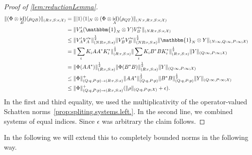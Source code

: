 \documentclass[11pt]{article}
\DeclareMathOperator{\id}{id}
\newcommand{\1}{\ensuremath{\mathbbm{1}}}
\theoremstyle{newdefinition}
\theoremstyle{newplain}
\theoremstyle{myplain}
\begin{document}
\begin{proof}[Proof of \cref{lem:reductionLemma}]
\begin{align}
    \|(\Phi\otimes\id_B)(\rho_{QB})\|_{(R:r,S:s;\mathcal{X})} &= \||1\rangle\langle 1|_N\otimes(\Phi\otimes\id_\mathcal{X})(\rho_{QT})\|_{(N:r,R:r,S:s;\mathcal{X})} \\ %
    &= \|V^\prime_A(\1_N\otimes Y)V_B^{\prime *}\|_{(NR:r,S:s;\mathcal{X})}  
    \\ &\leq \|V^\prime_AV_A^{\prime *}\|^{\frac{1}{2}}_{(NR:r,S:s)}\|V^\prime_BV_B^{\prime *}\|^{\frac{1}{2}}_{(NR:r,S:s)}\|\1_N\otimes Y\|_{(N:\infty,Q:\infty,P:\infty;\mathcal{X})} \\ &= \|\sum_iK_iAA^*K_i^*\|^{\frac{1}{2}}_{(R:r,S:s)}\|\sum_iK_iB^*BK_i^*\|^{\frac{1}{2}}_{(R:r,S:s)}\|Y\|_{(Q:\infty,P:\infty;\mathcal{X})} \\&= \|\Phi(AA^*)\|^{\frac{1}{2}}_{(R:r,S:s)}\|\Phi(B^*B)\|^{\frac{1}{2}}_{(R:r,S:s)} \|Y\|_{(Q:\infty,P:\infty;\mathcal{X})} \\&\leq  \|\Phi\|^+_{(Q:q,P:p)\to(R:r,S:s)}\|AA^*\|^{\frac{1}{2}}_{(Q:q,P:p)}\|B^*B\|^{\frac{1}{2}}_{(Q:q,P:p)}\|Y\|_{(Q:\infty,P:\infty;\mathcal{X})}%
    \\&\leq \|\Phi\|^+_{(Q:q,P:p)\to(R:r,S:s)}(\|\rho\|_{(Q:q,P:p;\mathcal{X})}+\epsilon).
\end{align} In the first and third equality, we used the multiplicativity of the operator-valued Schatten norms~\cref{prop:spliting.systems.left.}.
In the second line, we combined systems of equal indices. Since $\epsilon$ was arbitrary the claim follows. 
\end{proof} 
In the following we will extend this to completely bounded norms in the following way.
\end{document}
